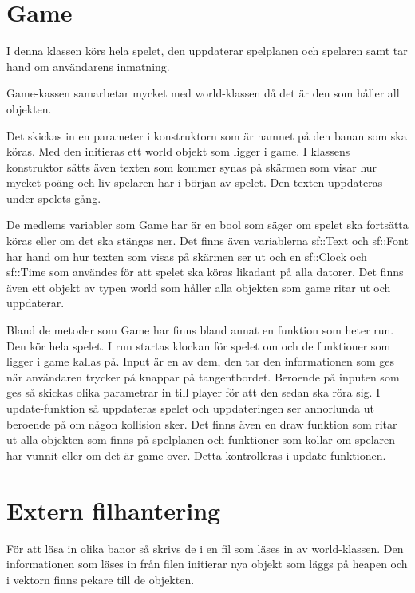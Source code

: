 \documentclass{TDP005mall}
\begin{document}
\section{Game}

I denna klassen körs hela spelet, den uppdaterar spelplanen och spelaren samt
tar hand om användarens inmatning. 

Game-kassen samarbetar mycket med world-klassen då det är den som håller all
objekten.

Det skickas in en parameter i konstruktorn som är namnet på den banan som ska
köras. Med den initieras ett world objekt som ligger i game. I klassens
konstruktor sätts även texten som kommer synas på skärmen som visar hur mycket
poäng och liv spelaren har i början av spelet. Den texten uppdateras under
spelets gång.

De medlems variabler som Game har är en bool som säger om spelet ska fortsätta
köras eller om det ska stängas ner. Det finns även variablerna sf::Text och
sf::Font har hand om hur texten som visas på skärmen ser ut och  en
sf::Clock och sf::Time som användes för att spelet ska köras likadant på alla
datorer. Det finns även ett objekt av typen world som håller alla objekten som
game ritar ut och uppdaterar.


Bland de metoder som Game har finns bland annat en funktion som heter run. Den
kör hela spelet. I run startas klockan för spelet om och de funktioner som
ligger i game kallas på. Input är en av dem, den tar den informationen som
ges när användaren trycker på knappar på tangentbordet. Beroende på inputen som
ges så skickas olika parametrar in till player för att den sedan ska röra sig. I
update-funktion så uppdateras spelet och uppdateringen ser annorlunda ut
beroende på om någon kollision sker. Det finns även en draw funktion som ritar
ut alla objekten som finns på spelplanen och funktioner som kollar
om spelaren har vunnit eller om det är game over. Detta kontrolleras i update-funktionen.


\section{Extern filhantering}

För att läsa in olika banor så skrivs de i en fil som läses in av
world-klassen. Den informationen som läses in från filen initierar nya objekt
som läggs på heapen och i vektorn finns pekare till de objekten.
\end{document}
